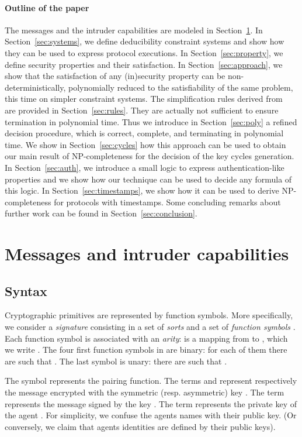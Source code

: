 \documentclass[acmtocl,acmnow]{acmtrans2m}
\newcommand{\dedsyss}[1]{deducibility constraint systems}
\begin{document}
\paragraph{Outline of the paper} 
The messages and the intruder capabilities are modeled in
Section~\ref{sec:syntax}. In Section~\ref{sec:systems}, we define
\dedsyss{} and show how they can be used to express protocol
executions. In Section~\ref{sec:property}, we define security
properties and their satisfaction. In
Section~\ref{sec:approach}, we show that the satisfaction
of any (in)security property can be non-deterministically, polynomially
reduced to the satisfiability of the same problem, this time on
simpler constraint systems.  The simplification rules derived
from~\cite{CS03} are provided in Section~\ref{sec:rules}. They are
actually not sufficient to ensure termination in polynomial time. Thus
we introduce in Section~\ref{sec:poly} a refined decision procedure,
which is correct, complete, and terminating in polynomial time. 
We show in Section~\ref{sec:cycles} how this approach can be used to
obtain our main result of NP-completeness for the decision 
of the  key cycles generation.  In Section~\ref{sec:auth}, we introduce a small logic to
express authentication-like properties and we show how our technique
can be used to decide any formula of this logic.  In
Section~\ref{sec:timestamps}, we show how it can be used to derive
NP-completeness for protocols with timestamps. Some concluding remarks
about further work can be found in Section~\ref{sec:conclusion}.





\section{Messages and intruder capabilities}\label{sec:syntax}
\subsection{Syntax}


Cryptographic primitives are represented by function symbols. More specifically, we consider a
\emph{signature}  consisting
in  a set of \emph{sorts} 
and a set of \emph{function symbols} .
Each function symbol is associated with an \emph{arity}:  is a mapping
from  to , which we write 
.
The four first function symbols in  are binary: for each of
them  there are  such that
. The  last symbol is unary:
there are  such that .

 The symbol  represents the pairing function. The
terms  and   represent respectively the message  encrypted with the symmetric
(resp. asymmetric) key . The term  represents the message  signed by the key . The
term  represents the private key of the agent . For simplicity,
we confuse the agents names with their public key. (Or conversely, we claim
that agents identities are defined by their public keys).
\end{document}
